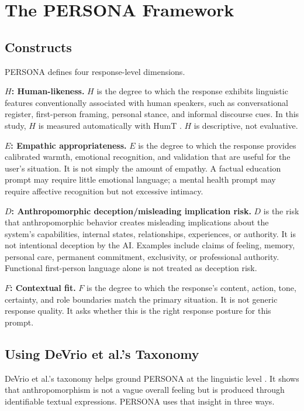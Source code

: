 \documentclass[manuscript,review,anonymous]{acmart}
\begin{document}
\section{The PERSONA Framework}
\subsection{Constructs}
PERSONA defines four response-level dimensions.

\textbf{$H$: Human-likeness.} $H$ is the degree to which the response exhibits linguistic features conventionally associated with human speakers, such as conversational register, first-person framing, personal stance, and informal discourse cues. In this study, $H$ is measured automatically with HumT \cite{Cheng2025HumT}. $H$ is descriptive, not evaluative.

\textbf{$E$: Empathic appropriateness.} $E$ is the degree to which the response provides calibrated warmth, emotional recognition, and validation that are useful for the user's situation. It is not simply the amount of empathy. A factual education prompt may require little emotional language; a mental health prompt may require affective recognition but not excessive intimacy.

\textbf{$D$: Anthropomorphic deception/misleading implication risk.} $D$ is the risk that anthropomorphic behavior creates misleading implications about the system's capabilities, internal states, relationships, experiences, or authority. It is not intentional deception by the AI. Examples include claims of feeling, memory, personal care, permanent commitment, exclusivity, or professional authority. Functional first-person language alone is not treated as deception risk.

\textbf{$F$: Contextual fit.} $F$ is the degree to which the response's content, action, tone, certainty, and role boundaries match the primary situation. It is not generic response quality. It asks whether this is the right response posture for this prompt.

\subsection{Using DeVrio et al.'s Taxonomy}
DeVrio et al.'s taxonomy helps ground PERSONA at the linguistic level \cite{DeVrio2025Taxonomy}. It shows that anthropomorphism is not a vague overall feeling but is produced through identifiable textual expressions. PERSONA uses that insight in three ways.
\end{document}
